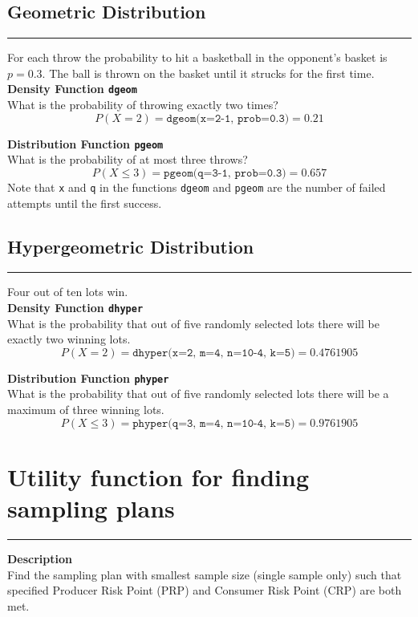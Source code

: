 \subsection{Geometric Distribution}
\noindent\rule[\linienAbstand]{\linewidth}{\linienDicke}
For each throw the probability to hit a basketball in the opponent’s basket is $p = 0.3$. The ball is thrown on the basket until it strucks for the first time.\\
\textbf{Density Function \texttt{dgeom}}\\
What is the probability of throwing exactly two times?
\begin{equation*}
  P(X=2) = \texttt{dgeom(x=2-1, prob=0.3)} = 0.21
\end{equation*}

\textbf{Distribution Function \texttt{pgeom}}\\
What is the probability of at most three throws?
\begin{equation*}
  P(X \leq 3) = \texttt{pgeom(q=3-1, prob=0.3)} = 0.657
\end{equation*}
Note that \texttt{x} and \texttt{q} in the functions \texttt{dgeom} and \texttt{pgeom} are the number of failed attempts until the first success.

\subsection{Hypergeometric Distribution}
\noindent\rule[\linienAbstand]{\linewidth}{\linienDicke}
Four out of ten lots win.\\
\textbf{Density Function \texttt{dhyper}}\\
What is the probability that out of five randomly selected lots there will be exactly two winning lots.
\begin{equation*}
  P(X=2) = \texttt{dhyper(x=2, m=4, n=10-4, k=5)} = 0.4761905
\end{equation*}

\textbf{Distribution Function \texttt{phyper}}\\
What is the probability that out of five randomly selected lots there will be a maximum of three winning lots.
\begin{equation*}
  P(X \leq 3) = \texttt{phyper(q=3, m=4, n=10-4, k=5)} = 0.9761905
\end{equation*}


\section{Utility function for finding sampling plans}
\noindent\rule[\linienAbstand]{\linewidth}{\linienDicke}
\textbf{Description}\\
Find the sampling plan with smallest sample size (single sample only) such that specified Producer Risk Point (PRP) and Consumer Risk Point (CRP) are both met.

